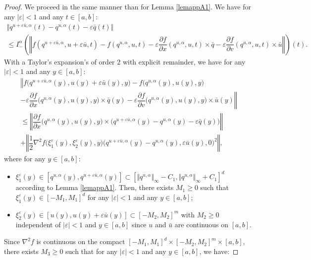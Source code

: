 \documentclass[english,11pt,reqno]{smfart}
\def\eps{\varepsilon}
\newcommand{\abs}[1]{\left\vert #1 \right\vert}
\begin{document}
\begin{proof}
We proceed in the same manner than for Lemma \ref{lemappA1}. We have for any $\abs{\eps} < 1$ and any $t \in [a,b]$:
\begin{multline}\label{eq654}
\Vert q^{u+\eps \bar{u},\alpha}(t) - q^{u,\alpha}(t) - \eps \bar{q}(t) \Vert \\ \leq I^\alpha_- \left( \left\Vert f(q^{u+\eps \bar{u},\alpha},u+\eps \bar{u},t)-f(q^{u,\alpha},u,t) - \eps \dfrac{\partial f}{\partial x}(q^{u,\alpha},u,t) \times \bar{q} - \eps \dfrac{\partial f}{\partial v}(q^{u,\alpha},u,t) \times \bar{u} \right\Vert \right)(t).
\end{multline}
With a Taylor's expansion's of order $2$ with explicit remainder, we have for any $\abs{\eps} < 1$ and any $y \in [a,b]$:
\begin{multline}\label{eq987}
\left\Vert f\big(q^{u+\eps \bar{u},\alpha}(y),u(y)+\eps \bar{u}(y),y\big)-f\big(q^{u,\alpha}(y),u(y),y\big) \right. \\ \left. - \eps \dfrac{\partial f}{\partial x}\big(q^{u,\alpha}(y),u(y),y\big) \times \bar{q}(y) - \eps \dfrac{\partial f}{\partial v}\big(q^{u,\alpha}(y),u(y),y\big) \times \bar{u}(y) \right\Vert  \\ \leq \left\Vert \dfrac{\partial f}{\partial x}\big(q^{u,\alpha}(y),u(y),y\big) \times \big(q^{u+\eps \bar{u},\alpha}(y)- q^{u,\alpha}(y)-\eps \bar{q}(y) \big) \right\Vert \\ + \left\Vert \dfrac{1}{2} \nabla^2 f \big(\xi^\eps_1 (y),\xi^\eps_2 (y),y\big)\big(q^{u+\eps \bar{u},\alpha}(y) - q^{u,\alpha}(y),\eps \bar{u}(y),0 \big)^2 \right\Vert ,
\end{multline}
where for any $y \in [a,b]$:
\begin{itemize}
\item $\xi^\eps_1 (y) \in [q^{u,\alpha}(y),q^{u+\eps \bar{u},\alpha}(y)] \subset [\Vert q^{u,\alpha} \Vert_\infty -C_1,\Vert q^{u,\alpha} \Vert_\infty +C_1 ]^d$ according to Lemma \ref{lemappA1}. Then, there exists $M_1 \geq 0$ such that $\xi^\eps_1 (y) \in [-M_1,M_1]^d$ for any $\abs{\eps} < 1$ and any $y \in [a,b]$;
\item $\xi^\eps_2 (y) \in [u(y),u(y)+\eps \bar{u}(y)] \subset [-M_2,M_2]^m$ with $M_2 \geq 0$ independent of $\vert \eps \vert < 1$ and $y \in [a,b]$ since $u$ and $\bar{u}$ are continuous on $[a,b]$.
\end{itemize}
Since $\nabla^2 f$ is continuous on the compact $[-M_1,M_1]^d \times [-M_2,M_2]^m \times [a,b]$, there exists $M_3 \geq 0$ such that for any $\vert \eps \vert < 1$ and any $y \in [a,b]$, we have:

\end{proof}
\end{document}
